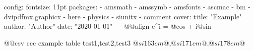 config:
  fontsize: 11pt
  packages:
    - amsmath
    - amssymb
    - amsfonts
    - ascmac
    - bm
    - dvipdfmx.graphicx
    - here
    - physics
    - siunitx
    - comment
cover:
  title: "Example"
  author: "Author"
  date: "2020-01-01"
---
@@align
e^{i\pi} = @cos \pi@ + i@sin 


@@csv ccc
example table
test1,test2,test3
$@si 163 cm@$,$@si 171 cm@$,$@si 178 cm@$

